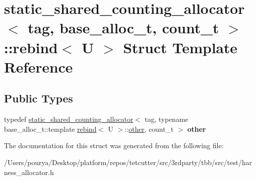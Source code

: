\hypertarget{structstatic__shared__counting__allocator_1_1rebind}{}\section{static\+\_\+shared\+\_\+counting\+\_\+allocator$<$ tag, base\+\_\+alloc\+\_\+t, count\+\_\+t $>$\+:\+:rebind$<$ U $>$ Struct Template Reference}
\label{structstatic__shared__counting__allocator_1_1rebind}
\subsection*{Public Types}
\begin{DoxyCompactItemize}
\item 
\hypertarget{structstatic__shared__counting__allocator_1_1rebind_a6729e666c8f3cd1d3a037ff1c6c892f7}{}typedef \hyperlink{classstatic__shared__counting__allocator}{static\+\_\+shared\+\_\+counting\+\_\+allocator}$<$ tag, typename base\+\_\+alloc\+\_\+t\+::template \hyperlink{structstatic__shared__counting__allocator_1_1rebind}{rebind}$<$ U $>$\+::\hyperlink{classstatic__shared__counting__allocator}{other}, count\+\_\+t $>$ {\bfseries other}\label{structstatic__shared__counting__allocator_1_1rebind_a6729e666c8f3cd1d3a037ff1c6c892f7}

\end{DoxyCompactItemize}


The documentation for this struct was generated from the following file\+:\begin{DoxyCompactItemize}
\item 
/\+Users/pourya/\+Desktop/platform/repos/tetcutter/src/3rdparty/tbb/src/test/harness\+\_\+allocator.\+h\end{DoxyCompactItemize}
